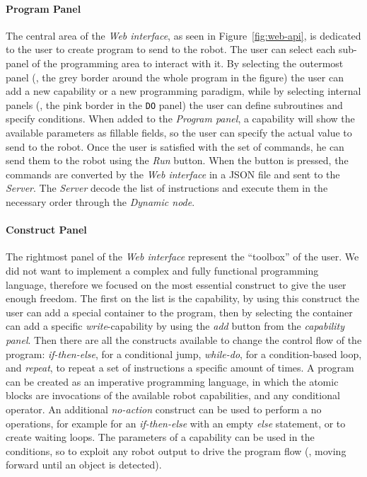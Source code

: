 \paragraph{Program Panel} The central area of the \textit{Web interface}, as seen in Figure~\ref{fig:web-api}, is dedicated to the user to create program to send to the robot. The user can select each sub-panel of the programming area to interact with it. By selecting the outermost panel (\ie, the grey border around the whole program in the figure) the user can add a new capability or a new programming paradigm, while by selecting internal panels (\eg, the pink border in the \texttt{DO} panel) the user can define subroutines and specify conditions. When added to the \textit{Program panel}, a capability will show the available parameters as fillable fields, so the user can specify the actual value to send to the robot. Once the user is satisfied with the set of commands, he can send them to the robot using the \textit{Run} button. When the button is pressed, the commands are converted by the \textit{Web interface} in a JSON file and sent to the \textit{Server}. The \textit{Server} decode the list of instructions and execute them in the necessary order through the \textit{Dynamic node}.

\paragraph{Construct Panel} The rightmost panel of the \textit{Web interface} represent the ``toolbox'' of the user. We did not want to implement a complex and fully functional programming language, therefore we focused on the most essential construct to give the user enough freedom. The first on the list is the capability, by using this construct the user can add a special container to the program, then by selecting the container can add a specific \textit{write}-capability by using the \textit{add} button from the \textit{capability panel}. Then there are all the constructs available to change the control flow of the program: \textit{if-then-else}, for a conditional jump, \textit{while-do}, for a condition-based loop, and \textit{repeat}, to repeat a set of instructions a specific amount of times. A program can be created as an imperative programming language, in which the atomic blocks are invocations of the available robot capabilities, and any conditional operator. An additional \textit{no-action} construct can be used to perform a no operations, for example for an \textit{if-then-else} with an empty \textit{else} statement, or to create waiting loops. The parameters of a capability can be used in the conditions, so to exploit any robot output to drive the program flow (\eg, moving forward until an object is detected). 

